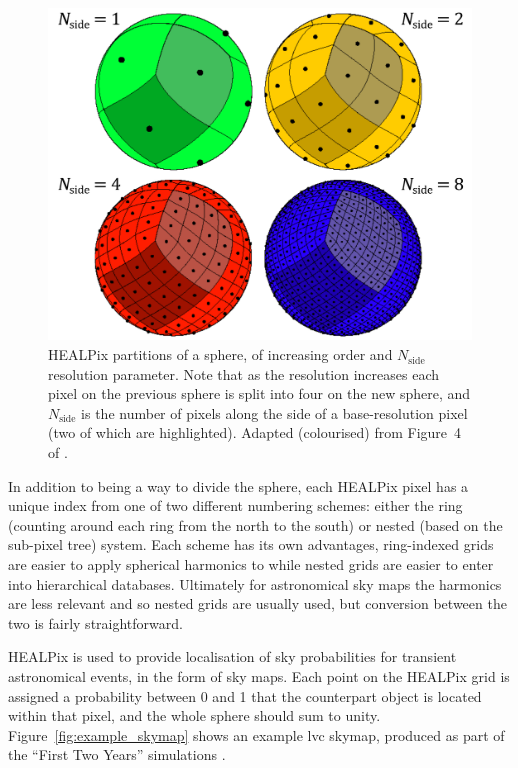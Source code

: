 \begin{colsection}
\begin{colsection}
\begin{figure}[t]
\begin{center}
\includegraphics[width=0.7\linewidth]{images/healpix.pdf}
\end{center}
\caption[HEALPix partitions of a sphere]{HEALPix partitions of a sphere, of increasing order and $N_\text{side}$ resolution parameter. Note that as the resolution increases each pixel on the previous sphere is split into four on the new sphere, and $N_\text{side}$ is the number of pixels along the side of a base-resolution pixel (two of which are highlighted). Adapted (colourised) from Figure~4 of \citet{HEALPix}.
}
\label{fig:healpix}
\end{figure}

In addition to being a way to divide the sphere, each HEALPix pixel has a unique index from one of two different numbering schemes: either the ring (counting around each ring from the north to the south) or nested (based on the sub-pixel tree) system. Each scheme has its own advantages, ring-indexed grids are easier to apply spherical harmonics to while nested grids are easier to enter into hierarchical databases. Ultimately for astronomical sky maps the harmonics are less relevant and so nested grids are usually used, but conversion between the two is fairly straightforward.

HEALPix is used to provide localisation of sky probabilities for transient astronomical events, in the form of sky maps. Each point on the HEALPix grid is assigned a probability between 0 and 1 that the counterpart object is located within that pixel, and the whole sphere should sum to unity. Figure~\ref{fig:example_skymap} shows an example \gls{lvc} skymap, produced as part of the ``First Two Years'' simulations \citep{First2Years}.


\end{colsection}
\end{colsection}
